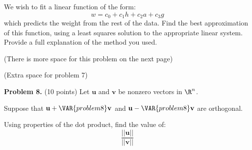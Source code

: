 \documentclass[12pt]{article}
\begin{document}
We wish to fit a linear function of the form:
\[
w=c_0+c_1h+c_2a+c_3g
\]
which predicts the weight from the rest of the data. Find the best approximation of this function, using a least squares solution to the appropriate linear system. Provide a full explanation of the method you used.

\vfill

(There is more space for this problem on the next page)

\clearpage

(Extra space for problem 7)

\clearpage

\textbf{Problem 8.} (10 points) Let $\mathbf{u}$ and $\mathbf{v}$ be nonzero vectors in $\R^n$.

Suppose that $\mathbf{u}+\VAR{problem8}\mathbf{v}$ and $\mathbf{u}-\VAR{problem8}\mathbf{v}$ are orthogonal.

Using properties of the dot product, find the value of:
\[
\frac{||\mathbf{u}||}{||\mathbf{v}||}
\]
\end{document}
